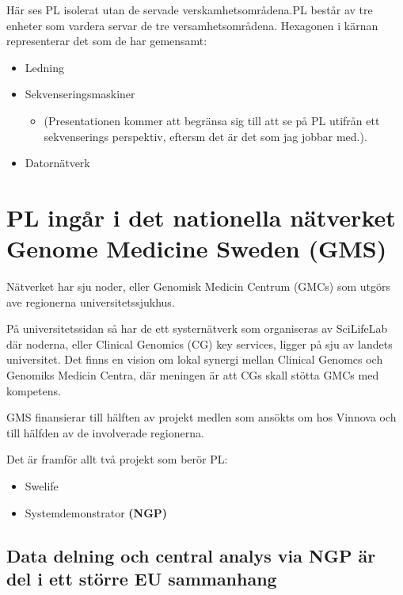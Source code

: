 \documentclass[
  letterpaper,
  DIV=11,
  numbers=noendperiod]{scrreprt}
\providecommand{\tightlist}{%
  \setlength{\itemsep}{0pt}\setlength{\parskip}{0pt}}\usepackage{longtable,booktabs,array}
\begin{document}
Här ses PL isolerat utan de servade verskamhetsområdena.PL består av tre
enheter som vardera servar de tre versamhetsområdena. Hexagonen i kärnan
representerar det som de har gemensamt:

\begin{itemize}
\tightlist
\item
  Ledning
\item
  Sekvenseringsmaskiner

  \begin{itemize}
  \tightlist
  \item
    (Presentationen kommer att begränsa sig till att se på PL utifrån
    ett sekvenserings perspektiv, eftersm det är det som jag jobbar
    med.).
  \end{itemize}
\item
  Datornätverk
\end{itemize}


\chapter{PL ingår i det nationella nätverket Genome Medicine Sweden
(GMS)}\label{pl-inguxe5r-i-det-nationella-nuxe4tverket-genome-medicine-sweden-gms}

Nätverket har sju noder, eller Genomisk Medicin Centrum (GMCs) som
utgörs ave regionerna universitetssjukhus.

På universitetssidan så har de ett systernätverk som organiseras av
SciLifeLab där noderna, eller Clinical Genomics (CG) key services,
ligger på sju av landets universitet. Det finns en vision om lokal
synergi mellan Clinical Genomcs och Genomiks Medicin Centra, där
meningen är att CGs skall stötta GMCs med kompetens.

GMS finansierar till hälften av projekt medlen som ansökts om hos
Vinnova och till hälfden av de involverade regionerna.

Det är framför allt två projekt som berör PL:

\begin{itemize}
\item
  Swelife
\item
  Systemdemonstrator \textbf{(NGP)}
\end{itemize}

\section{Data delning och central analys via NGP är del i ett större EU
sammanhang}\label{data-delning-och-central-analys-via-ngp-uxe4r-del-i-ett-stuxf6rre-eu-sammanhang}
\end{document}
